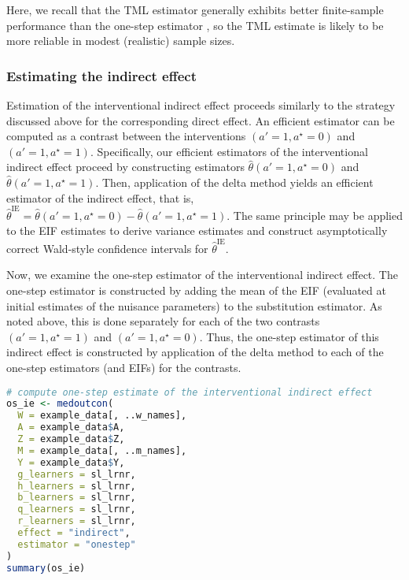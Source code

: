 \documentclass[
  12pt,
]{book}
\theoremstyle{definition}
\theoremstyle{definition}
\theoremstyle{definition}
\newcommand{\1}{\mathbbm{1}}
\begin{document}
Here, we recall that the TML estimator generally exhibits better finite-sample
performance than the one-step estimator \citep{vdl2011targeted, vdl2018targeted}, so
the TML estimate is likely to be more reliable in modest (realistic) sample
sizes.

\hypertarget{estimating-the-indirect-effect}{%
\subsubsection{Estimating the indirect effect}\label{estimating-the-indirect-effect}}

Estimation of the interventional indirect effect proceeds similarly to the
strategy discussed above for the corresponding direct effect. An efficient
estimator can be computed as a contrast between the interventions \((a' = 1, a^{\star} = 0)\) and \((a' = 1, a^{\star} = 1)\). Specifically, our efficient
estimators of the interventional indirect effect proceed by constructing
estimators \(\hat{\theta}(a' = 1, a^{\star} = 0)\) and \(\hat{\theta}(a' = 1, a^{\star} = 1)\). Then, application of the delta method yields an efficient
estimator of the indirect effect, that is, \(\hat{\theta}^{\text{IE}} = \hat{\theta}(a' = 1, a^{\star} = 0) - \hat{\theta}(a' = 1, a^{\star} = 1)\). The
same principle may be applied to the EIF estimates to derive variance estimates
and construct asymptotically correct Wald-style confidence intervals for
\(\hat{\theta}^{\text{IE}}\).

Now, we examine the one-step estimator of the interventional indirect effect.
The one-step estimator is constructed by adding the mean of the EIF
(evaluated at initial estimates of the nuisance parameters) to the substitution
estimator. As noted above, this is done separately for each of the two contrasts
\((a' = 1, a^{\star} = 1)\) and \((a' = 1, a^{\star} = 0)\). Thus, the one-step
estimator of this indirect effect is constructed by application of the delta
method to each of the one-step estimators (and EIFs) for the contrasts.

\begin{lstlisting}[language=R]
# compute one-step estimate of the interventional indirect effect
os_ie <- medoutcon(
  W = example_data[, ..w_names],
  A = example_data$A,
  Z = example_data$Z,
  M = example_data[, ..m_names],
  Y = example_data$Y,
  g_learners = sl_lrnr,
  h_learners = sl_lrnr,
  b_learners = sl_lrnr,
  q_learners = sl_lrnr,
  r_learners = sl_lrnr,
  effect = "indirect",
  estimator = "onestep"
)
summary(os_ie)
\end{lstlisting}
\end{document}
